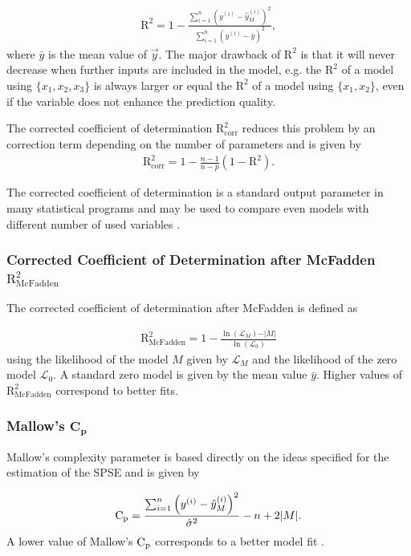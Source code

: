 \begin{align}
	\text{R}^2 = 1 - \frac{\sum_{i=1}^n \left( y^{(i)} - \hat y^{(i)}_M \right)^2}{\sum_{i=1}^n \left(y^{(i)} - \bar y\right)^2},
\end{align}
%
where $\bar y$ is the mean value of $\vec{y}$. The major drawback of $\text{R}^2$ is that it will never decrease when further inputs are included in the model, e.g. the $\text{R}^2$ of a model using $\{x_1, x_2, x_3\}$ is always larger or equal the $\text{R}^2$ of a model using $\{x_1, x_2\}$, even if the variable does not enhance the prediction quality. 

The corrected coefficient of determination $\text{R}_{\mathrm{corr}}^2$ reduces this problem by an correction term depending on the  number of parameters and is given by
\begin{align}
	\text{R}_{\mathrm{corr}}^2 = 1 - \frac{n-1}{n-p}(1-\text{R}^2).
\end{align}

The corrected coefficient of determination is a standard output parameter in many statistical programs and may be used to compare even models with different number of used variables \cite{fahrmeir2007regression}.

\subsubsection{Corrected Coefficient of Determination after McFadden $\text{R}_{\mathrm{McFadden}}^2$}

The corrected coefficient of determination after McFadden is defined as

\begin{align}
	\text{R}_{\mathrm{McFadden}}^2 = 1 - \frac{\ln{(\mathcal{L}_M)} - \vert M \vert }{\ln{(\mathcal{L}_0)}}
\end{align}
%
using the likelihood of the model $M$ given by $\mathcal{L}_M$ and the likelihood of the zero model $\mathcal{L}_0$. A standard zero model is given by the mean value $\bar y$. Higher values of $\text{R}_{\mathrm{McFadden}}^2$ correspond to better fits.

\subsubsection{Mallow's $\mathbf{C_p}$}

Mallow's complexity parameter is based directly on the ideas specified for the estimation of the SPSE and is given by

\begin{align}
	\text C_\mathrm{p} = \frac{\sum_{i=1}^n \left(y^{(i)} - \hat y^{(i)}_M\right)^2}{\hat \sigma^2} - n + 2 \vert M \vert.
\end{align}
%
A lower value of Mallow's $\text C_\mathrm{p}$ corresponds to a better model fit \cite{fahrmeir2007regression}.

